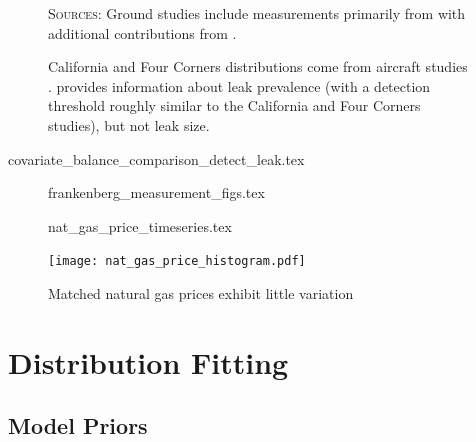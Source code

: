 \documentclass[12pt,oneside,letterpaper]{article}
\theoremstyle{definition}
\begin{document}
\begin{refsection}
\begin{figure}[!bth]
\textsc{Sources:}
Ground studies include measurements primarily from
\textcite{Robertson/Edie/Snare/Soltis/Field/Burkhart/Bell/Zimmerle/Murphy:2017}
with additional contributions from
\textcite{
Rella/Tsai/Botkin/Crosson/Steele:2015,
Omara/Sullivan/Li/Subramanian/Robinson/Presto:2016,
Omara/Zimmerman/Sullivan/Li/Ellis/Cesa/Subramanian/Presto/Robinson:2018,
}.

California and Four Corners distributions come from aircraft studies \parencite{Duren/etal:2019, Frankenberg/etal:2016}.
\textcite{Lyon/Alvarez/Zavala-Araiza/Brandt/Jackson/Hamburg:2016}
provides information about leak prevalence (with a detection threshold roughly similar to the California and Four Corners studies), but not leak size.
\end{figure}



\begin{table}[!bth] %
{covariate_balance_comparison_detect_leak.tex}
\end{table}


\begin{figure}[!hbt] %
{frankenberg_measurement_figs.tex}
\end{figure}


\begin{figure}[!hbt] %
{nat_gas_price_timeseries.tex}
\end{figure}


\begin{figure}[!hbt] %
\caption{Matched natural gas prices exhibit little variation}
\label{fig:nat-gas-price-histogram}
\texttt{[image: nat\_gas\_price\_histogram.pdf]}
\end{figure}





\newpage

\section{Distribution Fitting}
\label{app:distribution-fitting}

\subsection{Model Priors}
\label{sec:model-priors}


\end{refsection}
\end{document}
